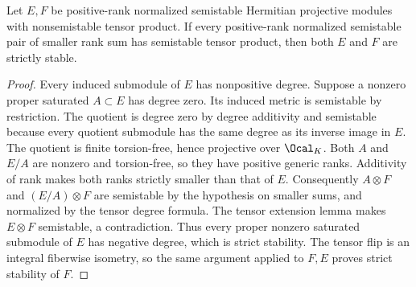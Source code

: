 \begin{lemma}
\label{lem:strict-factors-minimal-rank}
\leanok
Let $E,F$ be positive-rank normalized semistable Hermitian projective
modules with nonsemistable tensor product. If every positive-rank
normalized semistable pair of smaller rank sum has semistable tensor
product, then both $E$ and $F$ are strictly stable.
\end{lemma}
\begin{proof}
Every induced submodule of $E$ has nonpositive degree. Suppose a
nonzero proper saturated $A\subset E$ has degree zero. Its induced
metric is semistable by restriction. The quotient is degree zero by
degree additivity and semistable because every quotient submodule
has the same degree as its inverse image in $E$. The quotient is
finite torsion-free, hence projective over $\Ocal_K$. Both $A$ and
$E/A$ are nonzero and torsion-free, so they have positive generic
ranks. Additivity of rank makes both ranks strictly smaller than
that of $E$. Consequently $A\otimes F$ and $(E/A)\otimes F$ are
semistable by the hypothesis on smaller sums, and normalized by the
tensor degree formula. The tensor extension lemma makes $E\otimes F$
semistable, a contradiction. Thus every proper nonzero saturated
submodule of $E$ has negative degree, which is strict stability.
The tensor flip is an integral fiberwise isometry, so the same
argument applied to $F,E$ proves strict stability of $F$.
\end{proof}

